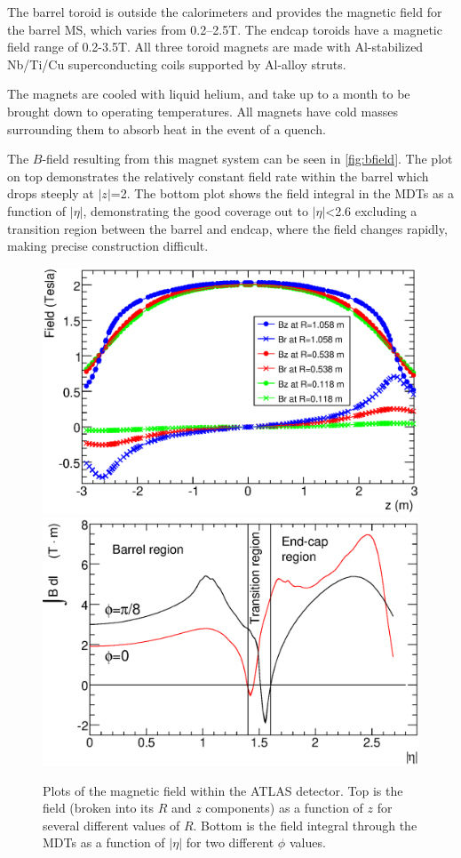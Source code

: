 The barrel toroid is outside the calorimeters and provides the magnetic field for the barrel \ac{MS}, which varies from 0.2–2.5T. The endcap toroids have a magnetic field range of 0.2-3.5T. All three toroid magnets are made with Al-stabilized Nb/Ti/Cu superconducting coils supported by Al-alloy struts. 

The magnets are cooled with liquid helium, and take up to a month to be brought down to operating temperatures. All magnets have cold masses surrounding them to absorb heat in the event of a quench. 

The $B$-field resulting from this magnet system can be seen in \autoref{fig:bfield}. The plot on top demonstrates the relatively constant field rate within the barrel which drops steeply at $|z|$=2. The bottom plot shows the field integral in the \acp{MDT} as a function of $|\eta|$, demonstrating the good coverage out to $|\eta|$<2.6 excluding a transition region between the barrel and endcap, where the field changes rapidly, making precise \pt construction difficult. 

\begin{centering}
\begin{figure}[!htb]
\myfloatalign
\includegraphics[width=.90\linewidth]{figures/atlas/solMeasB.eps}
\includegraphics[width=.90\linewidth]{figures/atlas/IBdl.eps}
\caption{Plots of the magnetic field within the ATLAS detector. Top is the field (broken into its $R$ and $z$ components) as a function of $z$ for several different values of $R$. Bottom is the field integral through the \acp{MDT} as a function of $|\eta|$ for two different $\phi$ values. }
\label{fig:bfield}
\end{figure}
\end{centering}

